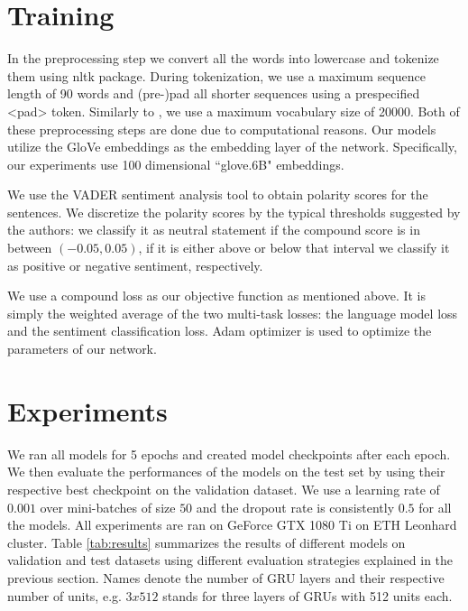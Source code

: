\documentclass{article}
\begin{document}
\section{Training}
In the preprocessing step we convert all the words into lowercase and tokenize them using nltk package. During tokenization, we use a maximum sequence length of 90 words and (pre-)pad all shorter sequences using a prespecified <pad> token. Similarly to \citet{schwartz2017effect}, we use a maximum vocabulary size of 20000. Both of these preprocessing steps are done due to computational reasons. Our models utilize the GloVe embeddings \citep{pennington2014glove} as the embedding layer of the network. Specifically, our experiments use 100 dimensional ``glove.6B" embeddings.

\par We use the VADER \citep{hutto2014vader} sentiment analysis tool to obtain polarity scores for the sentences. We discretize the polarity scores by the typical thresholds suggested by the authors: we classify it as neutral statement if the compound score is in between $(-0.05, 0.05)$, if it is either above or below that interval we classify it as positive or negative sentiment, respectively.

\par We use a compound loss as our objective function as mentioned above. It is simply the weighted average of the two multi-task losses: the language model loss and the sentiment classification loss. Adam optimizer is used to optimize the parameters of our network.

\section{Experiments}
We ran all models for 5 epochs and created model checkpoints after each epoch. We then evaluate the performances of the models on the test set by using their respective best checkpoint on the validation dataset. We use a learning rate of $0.001$ over mini-batches of size $50$ and the dropout rate is consistently $0.5$ for all the models. All experiments are ran on GeForce GTX 1080 Ti on ETH Leonhard cluster. Table \ref{tab:results} summarizes the results of different models on validation and test datasets using different evaluation strategies explained in the previous section. Names denote the number of GRU layers and their respective number of units, e.g. $3x512$ stands for three layers of GRUs with 512 units each.
\end{document}
